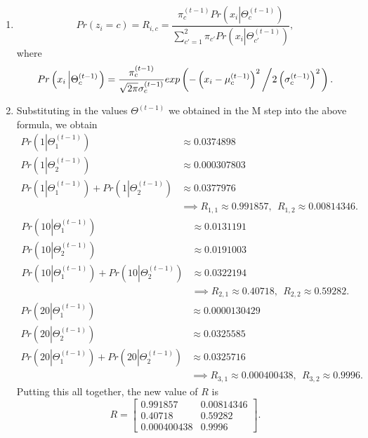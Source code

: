 \documentclass{article}
\newcommand{\bbm}{\begin{bmatrix}}
\newcommand{\ebm}{\end{bmatrix}}
\begin{document}
\begin{enumerate}
    \item 
    \[
        Pr(z_i=c)=R_{i,c} = \frac{\pi^{(t-1)}_cPr\left(x_i\left|\Theta^{(t-1)}_c\right.\right)}{\sum^2_{c'=1}\pi_{c'}Pr\left(x_i\left|\Theta_{c'}^{(t-1)}\right.\right)},
    \]
    where
    \[
        Pr\left(x_i\left|\Theta^{(t-1)}_c\right.\right) = \frac{\pi_c^{(t-1)}}{\sqrt{2\pi}\sigma_c^{(t-1)}}exp\left(-\left(x_i-\mu_c^{(t-1)}\right)^2\left/2\left(\sigma^{(t-1)}_c\right)^2\right.\right).
    \]
    \item Substituting in the values $\Theta^{(t-1)}$ we obtained in the M step into the above formula, we obtain
    \begin{align*}
        Pr\left(1\left|\Theta^{(t-1)}_1\right.\right)&\approx 0.0374898 \\
        Pr\left(1\left|\Theta^{(t-1)}_2\right.\right)&\approx 0.000307803\\
        Pr\left(1\left|\Theta^{(t-1)}_1\right.\right)+Pr\left(1\left|\Theta^{(t-1)}_2\right.\right)&\approx  0.0377976\\
        &\implies R_{1,1}\approx 0.991857,~~R_{1,2}\approx 0.00814346.
    \end{align*}
    \begin{align*}
        Pr\left(10\left|\Theta^{(t-1)}_1\right.\right)&\approx 0.0131191 \\
        Pr\left(10\left|\Theta^{(t-1)}_2\right.\right)&\approx  0.0191003\\
        Pr\left(10\left|\Theta^{(t-1)}_1\right.\right)+Pr\left(10\left|\Theta^{(t-1)}_2\right.\right)&\approx  0.0322194\\
        &\implies R_{2,1}\approx 0.40718,~~R_{2,2}\approx 0.59282.
    \end{align*}
    \begin{align*}
        Pr\left(20\left|\Theta^{(t-1)}_1\right.\right)&\approx  0.0000130429\\
        Pr\left(20\left|\Theta^{(t-1)}_2\right.\right)&\approx 0.0325585 \\
        Pr\left(20\left|\Theta^{(t-1)}_1\right.\right)+Pr\left(20\left|\Theta^{(t-1)}_2\right.\right)&\approx 0.0325716\\
        &\implies R_{3,1}\approx 0.000400438 ,~~R_{3,2}\approx 0.9996.
    \end{align*}
    Putting this all together, the new value of $R$ is 
    \[
        R=\bbm 0.991857 & 0.00814346 \\
        0.40718 & 0.59282 \\
        0.000400438 & 0.9996
        \ebm.
    \]
\end{enumerate}
\end{document}
